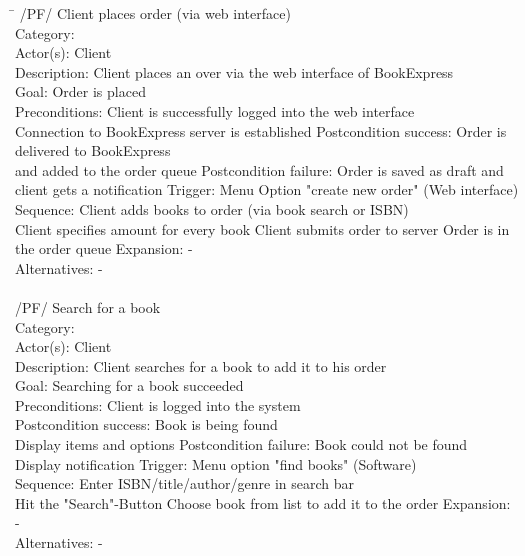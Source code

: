 \documentclass[11pt,a4paper,oneside,svgnames,draft]{report}
\begin{document}
\begin{tabbing}
\hspace{3cm}\=\kill
/PF/ \> Client places order (via web interface)\\ 
	 Category: \> \\
	 Actor(s): \> Client\\ 
	 Description: \> Client places an over via the web interface of BookExpress\\ 
	 Goal: \> Order is placed\\
	 Preconditions: \> Client is successfully logged into the web interface\\
	 \> Connection to BookExpress server is established
	 Postcondition success: \> Order is delivered to BookExpress\\
	 \> and added to the order queue
	 Postcondition failure: \> Order is saved as draft and\\
	 \> client gets a notification
	 Trigger: \> Menu Option "create new order" (Web interface)\\
	 Sequence: \> Client adds books to order (via book search or ISBN)\\
	 \> Client specifies amount for every book
	 \> Client submits order to server
	 \> Order is in the order queue
	 Expansion: \> -\\
	 Alternatives: \> -\\
	 \\
	 /PF/ \> Search for a book\\ 
	 Category: \> \\
	 Actor(s): \> Client\\ 
	 Description: \> Client searches for a book to add it to his order\\ 
	 Goal: \> Searching for a book succeeded\\
	 Preconditions: \> Client is logged into the system\\
	 Postcondition success: \> Book is being found\\
	 \> Display items and options
	 Postcondition failure: \> Book could not be found\\
	 \> Display notification
	 Trigger: \> Menu option "find books" (Software)\\
	 Sequence: \> Enter ISBN/title/author/genre in search bar\\
	 \> Hit the "Search"-Button
	 \> Choose book from list to add it to the order
	 Expansion: \> -\\
	 Alternatives: \> -\\
	 \\
\end{tabbing} 
\clearpage
\end{document}
